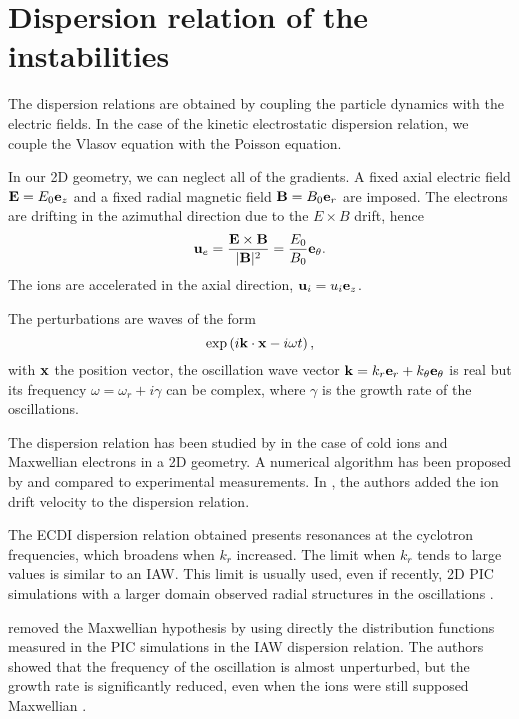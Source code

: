 
\section{Dispersion relation of the instabilities}
  \label{sec-DR-kinetic}
  
  
  The dispersion relations are obtained by coupling the particle dynamics with the electric fields.
  In the case of the kinetic electrostatic dispersion relation, we couple the Vlasov equation with the Poisson equation.
  
  In our \ac{2D} geometry, we can neglect all of the gradients.
  A fixed axial electric field ${\mathbf E} = E_0 {\mathbf e_z}$ and a fixed radial magnetic field ${\mathbf B} = B_0 {\mathbf e_r}$ are imposed.
  The electrons are drifting in the azimuthal direction due to the $E\times B$ drift, hence
  \[ {\mathbf u_{e}} = \frac{{\mathbf E} \times {\mathbf B}}{\lvert{\mathbf B}\rvert^2} = \frac{E_0}{B_0}  {\mathbf e_{\theta}}.    \]
  The ions are accelerated in the axial direction, $ {\mathbf u_i} = u_i  {\mathbf e_z}$.
  
  The perturbations are waves of the form \[ \exp \left( i {\mathbf k} \cdot {\mathbf x} - i \omega t  \right), \]
  with ${\mathbf x}$ the position vector, the oscillation wave vector ${\mathbf k} = k_r {\mathbf e_r} + k_{\theta} {\mathbf e_{\theta}}$ is real but its frequency $\omega = \omega_r + i \gamma$ can be complex, where $\gamma$ is the growth rate of the oscillations. 
  
  \vspace{1em}
  The dispersion relation has been studied by \citet{ducrocq2006} in the case of cold ions and Maxwellian electrons in a \ac{2D} geometry.
  A numerical algorithm has been proposed by \citet{cavalier2013} and compared to experimental measurements.
  In \citet{lafleur2016}, the authors added the ion drift velocity to the dispersion relation.
  
  The \ac{ECDI} dispersion relation obtained presents resonances at the cyclotron frequencies, which broadens when $k_r$ increased.
  The limit when $k_r$ tends to large values is similar to an \ac{IAW}.
  This limit is usually used, even if recently, \ac{2D} \ac{PIC} simulations with a larger domain observed radial structures in the oscillations \citep{janhunen2018,hara2019a}.
  
  \citet{lafleur2018} removed the Maxwellian hypothesis by using directly the distribution functions measured in the \ac{PIC} simulations in the \ac{IAW} dispersion relation.
  The authors showed that the frequency of the oscillation is almost unperturbed, but the growth rate is significantly reduced, even when the ions were still supposed Maxwellian \citep[Fig. 8]{lafleur2018}.
  
